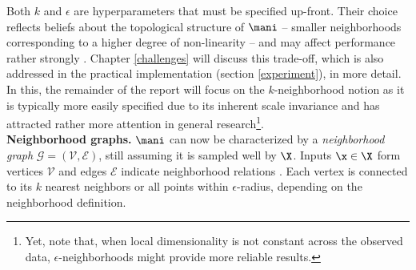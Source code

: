 Both $k$ and $\epsilon$ are hyperparameters that must be specified up-front.
Their choice reflects beliefs about the topological structure of $\mani$ -- 
smaller neighborhoods corresponding to a higher degree of non-linearity -- and 
may affect performance rather strongly \citep{sudderth2002}.
Chapter \ref{challenges} will discuss this trade-off, which is also addressed in 
the practical implementation (section \ref{experiment}), in more detail.
In this, the remainder of the report will focus on the $k$-neighborhood notion 
as it is typically more easily specified due to its inherent scale invariance 
and has attracted rather more attention in general research\footnote{
Yet, \citet{tenenbaumdesilvalangford2000} note that, when local dimensionality 
is not constant across the observed data, $\epsilon$-neighborhoods might provide 
more reliable results.
}. 
\\

\textbf{Neighborhood graphs.}
$\mani$ can now be characterized by a \textit{neighborhood 
graph} $\mathcal{G} = (\mathcal{V}, \mathcal{E})$, still assuming it is 
sampled well by $\X$. 
Inputs $\x \in \X$ form vertices $\mathcal{V}$ and edges $\mathcal{E}$ 
indicate neighborhood relations \citep{belkinniyogi2001}.
Each vertex is connected to its $k$ nearest neighbors or all points 
within $\epsilon$-radius, depending on the neighborhood definition.


